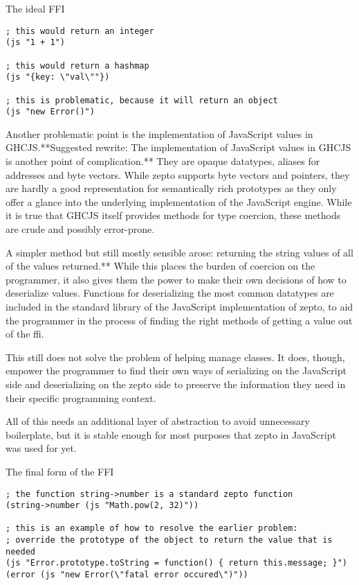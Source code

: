 \documentclass[oneside,11pt,xetex]{scrbook}
\begin{document}
\begin{listing}[H]
\caption{The ideal FFI}
\begin{verbatim}
; this would return an integer
(js "1 + 1")

; this would return a hashmap
(js "{key: \"val\""})

; this is problematic, because it will return an object
(js "new Error()")
\end{verbatim}
\end{listing}

Another problematic point is the implementation of JavaScript values in GHCJS.**Suggested rewrite: The implementation of JavaScript values in GHCJS is another point of complication.** They
are opaque datatypes, aliases for addresses and byte vectors. While zepto supports
byte vectors and pointers, they are hardly a good representation for semantically rich
prototypes as they only offer a glance into the underlying implementation of the
JavaScript engine. While it is true that GHCJS itself provides methods for type
coercion, these methods are crude and possibly error-prone.

A simpler method but still mostly sensible arose: returning the string
values of all of the values returned.** While this places the burden of coercion
on the programmer, it also gives them the power to make their own 
decisions of how to deserialize values. Functions for deserializing the most
common datatypes are included in the standard library of the JavaScript
implementation of zepto, to aid the programmer in the process of finding
the right methods of getting a value out of the \gls{ffi}.

This still does not solve the problem of helping manage classes. It does, though, empower
the programmer to find their own ways of serializing on the JavaScript side
and deserializing on the zepto side to preserve the information they need in
their specific programming context.

All of this needs an additional layer of abstraction to avoid unnecessary
boilerplate, but it is stable enough for most purposes that zepto in JavaScript
was used for yet.

\begin{listing}[H]
\caption{The final form of the FFI}
\begin{verbatim}
; the function string->number is a standard zepto function
(string->number (js "Math.pow(2, 32)"))

; this is an example of how to resolve the earlier problem:
; override the prototype of the object to return the value that is needed
(js "Error.prototype.toString = function() { return this.message; }")
(error (js "new Error(\"fatal error occured\")"))
\end{verbatim}
\end{listing}
\end{document}
